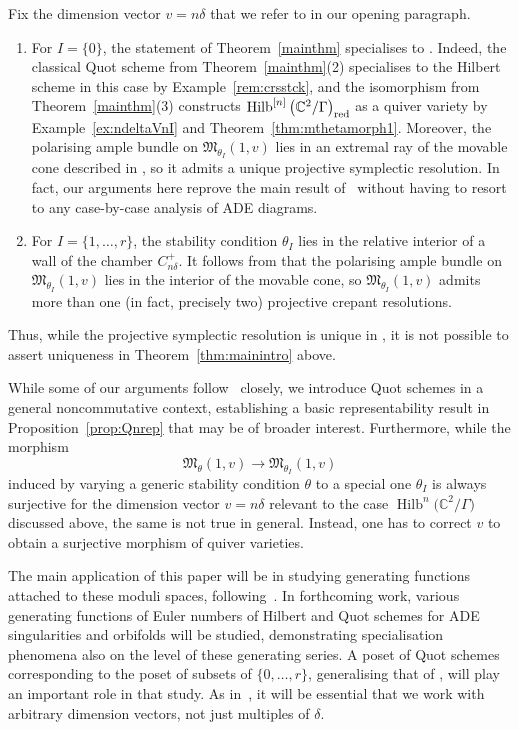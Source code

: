 \documentclass[pdftex]{sigma}%
\newcommand{\SC}{\mathbb{C}} %
\DeclareMathOperator{\Hilb}{\mathrm{Hilb}}
\numberwithin{equation}{section}
\begin{document}
 \begin{Remark}
 Fix the dimension vector $v=n\delta$ that we refer to in our opening paragraph.
 \begin{enumerate}\itemsep=0pt
 \item For $I=\{0\}$, the statement of
 Theorem~\ref{mainthm} specialises to \cite[Theorem~1.1]{craw2019punctual}.
 Indeed, the classical Quot scheme from Theorem~\ref{mainthm}(2) specialises to the Hilbert scheme in this case by Example~\ref{rem:crsstck}, and the isomorphism from Theorem~\ref{mainthm}(3) constructs $\Hilb^{[n]}\big(\mathbb{C}^2/\Gamma\big)_{\rm red}$ as a quiver variety by Example~\ref{ex:ndeltaVnI} and Theorem~\ref{thm:mthetamorph1}. Moreover, the polarising ample bundle on $\mathfrak{M}_{\theta_I}(1,v)$ lies in an extremal ray of the movable cone described in \cite{bellamy2020birational}, so it admits a unique projective symplectic resolution.
 In fact, our arguments here reprove the main result of~\cite{craw2019punctual} without having to resort to any case-by-case analysis of ADE diagrams.
 \item For $I=\{1,\dots, r\}$, the stability condition $\theta_I$ lies in the relative interior of a wall of the chamber $C^+_{n\delta}$. It follows from \cite[Theorem~1.2]{bellamy2020birational} that the polarising ample bundle on $\mathfrak{M}_{\theta_I}(1,v)$ lies in the interior of the movable cone, so $\mathfrak{M}_{\theta_I}(1,v)$ admits more than one (in fact, precisely two) projective crepant resolutions.
 \end{enumerate}
 Thus, while the projective symplectic resolution is unique in \cite[Theorem~1.1]{craw2019punctual}, it is not possible to assert uniqueness
 in Theorem~\ref{thm:mainintro} above.
 \end{Remark}

While some of our
arguments follow~\cite{craw2019punctual} closely,
we introduce
Quot schemes in a general noncommutative
context, establishing a basic representability result in Proposition~\ref{prop:Qnrep} that may be of broader interest. Furthermore, while the
morphism
\[ \mathfrak{M}_\theta(1,v) \longrightarrow \mathfrak{M}_{\theta_I}(1,v) \]
induced by varying a generic stability condition $\theta$ to a special one $\theta_I$ is always surjective for the
dimension vector $v=n\delta$ relevant to the case $\Hilb^n\big(\SC^2/\Gamma\big)$ discussed above,
the same is not true in general.
Instead, one has to correct $v$ to
obtain a surjective morphism of quiver varieties.

The main application of
this paper will be in studying
generating functions attached to these moduli spaces,
following~\cite{gyenge2017euler, gyenge2018euler}.
In forthcoming work, various generating functions of Euler numbers of Hilbert
and Quot schemes for ADE singularities and orbifolds will be studied, demonstrating
specialisation phenomena also on the level of these generating series.
A poset of Quot schemes corresponding to the poset of
subsets of $\{0, \dots, r\}$,
generalising that of \cite[Section~5]{craw2019punctual},
will play an important role in that study.
As in~\cite{gyenge2017euler, gyenge2018euler}, it will be essential
that we work with arbitrary dimension vectors,
not just multiples of $\delta$.
\end{document}
